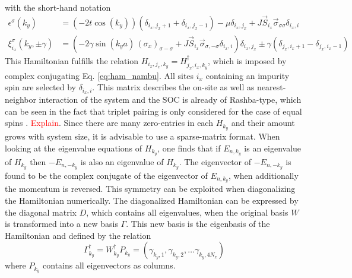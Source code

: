 with the short-hand notation 
\begin{align}\nonumber
    \epsilon^{\sigma}(k_y) &= \left( -2t \cos{(k_y)}\right)(\delta_{i_x,j_x+1}+\delta_{i_x,j_x-1})-\mu\delta_{i_x,j_x} + J\Vec{S}_{i_x}\Vec{\sigma}_{\sigma \sigma}\delta_{i_x,i} \\ \label{eq:ham_num_shorthand}
    \xi^{\sigma}_{i_x}(k_y,\pm \gamma) &= \left( -2 \gamma \sin{(k_ya)} \, (\sigma_x)_{\sigma-\sigma}+ J\Vec{S}_{i_x}\Vec{\sigma}_{\sigma, -\sigma}\delta_{i_x,i}\right)\delta_{i_x,j_x} \pm\gamma (\delta_{j_x,i_x+1}-\delta_{j_x,i_x-1})
\end{align}
This Hamiltonian fulfills the relation $H_{i_x, j_x, k_y} = H^{\dag}_{j_x, i_x, k_y}$, which is imposed by complex conjugating Eq. \eqref{eq:ham_nambu}. \newline
All sites $i_x$ containing an impurity spin are selected by $\delta_{i_x,i}$.\newline
This matrix describes the on-site as well as nearest-neighbor interaction of the system and the SOC is already of Rashba-type, which can be seen in the fact that triplet pairing is only considered for the case of equal spins \cite{frigeri2004superconductivity}. \textcolor{red}{Explain}.
Since there are many zero-entries in each $H_{k_y}$ and their amount grows with system size, it is advisable to use a sparse-matrix format.
\newline
When looking at the eigenvalue equations of $H_{k_y}$, one finds that if $E_{n,k_y}$ is an eigenvalue of $H_{k_y}$ then $-E_{n,-k_y}$ is also an eigenvalue of $H_{k_y}$.
The eigenvector of $-E_{n,-k_y}$ is found to be the complex conjugate of the eigenvector of $E_{n,k_y}$, when additionally the momentum is reversed.
This symmetry can be exploited when diagonalizing the Hamiltonian numerically. \newline
The diagonalized Hamiltonian can be expressed by the diagonal matrix $D$, which contains all eigenvalues, when the original basis $W$ is transformed into a new basis $\Gamma$.
This new basis is the eigenbasis of the Hamiltonian and defined by the relation 
\begin{equation}
    \Gamma^{\dag}_{k_y} = W^{\dag}_{k_y} P_{k_y} = \left( \gamma_{k_y,1}, \gamma_{k_y,2}, \hdots \gamma_{k_y,4N_x}\right)
\end{equation}
where $P_{k_y}$ contains all eigenvectors as columns. 
